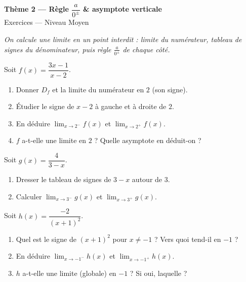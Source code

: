 \documentclass[11pt,a4paper]{article}
\begin{document}
\begin{center}
{\Large\bfseries\color{primarydark}Thème 2 — Règle $\dfrac{a}{0^{\pm}}$ \& asymptote verticale}\\[2pt]
{\large\color{primary}Exercices — Niveau Moyen}
\end{center}
\vspace{4pt}
{\small\itshape On calcule une limite en un point interdit : limite du numérateur, tableau de signes
du dénominateur, puis règle $\frac{a}{0^{\pm}}$ de chaque côté.}
\vspace{6pt}

\begin{exercice}
Soit $f(x)=\dfrac{3x-1}{x-2}$.
\begin{enumerate}[label=\alph*),leftmargin=2em,itemsep=3pt]
  \item Donner $D_f$ et la limite du numérateur en $2$ (son signe).
  \item Étudier le signe de $x-2$ à gauche et à droite de $2$.
  \item En déduire $\displaystyle\lim_{x\to 2^{-}} f(x)$ et $\displaystyle\lim_{x\to 2^{+}} f(x)$.
  \item $f$ a-t-elle une limite en $2$ ? Quelle asymptote en déduit-on ?
\end{enumerate}
\end{exercice}

\begin{exercice}
Soit $g(x)=\dfrac{4}{3-x}$.
\begin{enumerate}[label=\alph*),leftmargin=2em,itemsep=3pt]
  \item Dresser le tableau de signes de $3-x$ autour de $3$.
  \item Calculer $\displaystyle\lim_{x\to 3^{-}} g(x)$ et $\displaystyle\lim_{x\to 3^{+}} g(x)$.
\end{enumerate}
\end{exercice}

\begin{exercice}
Soit $h(x)=\dfrac{-2}{(x+1)^2}$.
\begin{enumerate}[label=\alph*),leftmargin=2em,itemsep=3pt]
  \item Quel est le signe de $(x+1)^2$ pour $x\neq -1$ ? Vers quoi tend-il en $-1$ ?
  \item En déduire $\displaystyle\lim_{x\to -1^{-}} h(x)$ et $\displaystyle\lim_{x\to -1^{+}} h(x)$.
  \item $h$ a-t-elle une limite (globale) en $-1$ ? Si oui, laquelle ?
\end{enumerate}
\end{exercice}
\end{document}
